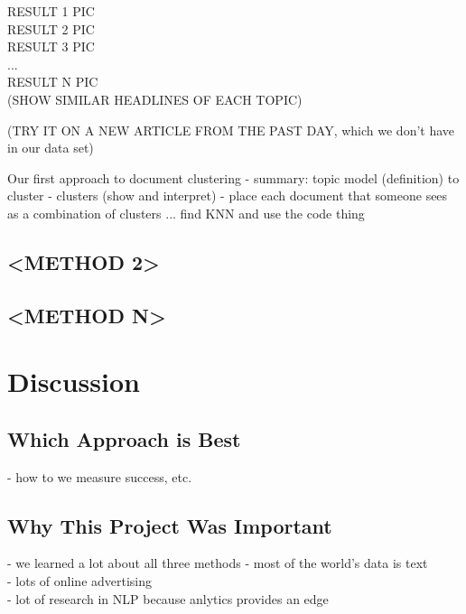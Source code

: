 \documentclass[11pt]{article}
\begin{document}
RESULT 1 PIC \\ 
RESULT 2 PIC\\ 
RESULT 3 PIC\\

...\\

RESULT N PIC \\




(SHOW SIMILAR HEADLINES OF EACH TOPIC)


(TRY IT ON A NEW ARTICLE FROM THE PAST DAY, which we don't have in our data set)


Our first approach to document clustering 
- summary: topic model (definition) to cluster
- clusters (show and interpret)
- place each document that someone sees as a combination of clusters ... find KNN and use the code thing


\subsection{<METHOD 2>}

\subsection{<METHOD N>}



\section{Discussion}
\subsection{Which Approach is Best}
- how to we measure success, etc.

\subsection{Why This Project Was Important}
- we learned a lot about all three methods
- most of the world's data is text \\
- lots of online advertising \\
- lot of research in NLP because anlytics provides an edge \\
\end{document}
